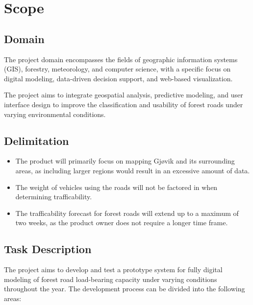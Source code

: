 \section{Scope}
\subsection{Domain}

The project domain encompasses the fields of geographic information systems (GIS), forestry, meteorology, and computer science, with a specific focus on digital modeling, data-driven decision support, and web-based visualization. 

The project aims to integrate geospatial analysis, predictive modeling, and user interface design to improve the classification and usability of forest roads under varying environmental conditions.  

\subsection{Delimitation}
\begin{itemize}
    \item The product will primarily focus on mapping Gjøvik and its surrounding areas, as including larger regions would result in an excessive amount of data.
    \item The weight of vehicles using the roads will not be factored in when determining trafficability.
    \item The trafficability forecast for forest roads will extend up to a maximum of two weeks, as the product owner does not require a longer time frame.
\end{itemize}

\subsection{Task Description}

The project aims to develop and test a prototype system for fully digital modeling of forest road load-bearing capacity under varying conditions throughout the year. The development process can be divided into the following areas:

